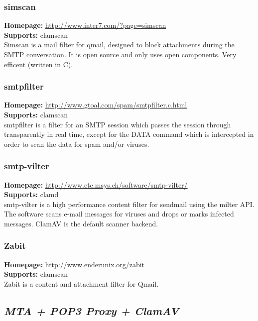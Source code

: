 \documentclass[a4paper,titlepage,12pt]{article}
\begin{document}
    \subsubsection{simscan}
    \textbf{Homepage:} \url{http://www.inter7.com/?page=simscan}\\
    \textbf{Supports:} clamscan\\[4pt]
    Simscan is a mail filter for qmail, designed to block attachments during
    the SMTP conversation. It is open source and only uses open components.
    Very efficent (written in C).

    \subsubsection{smtpfilter}
    \textbf{Homepage:} \url{http://www.gtoal.com/spam/smtpfilter.c.html}\\
    \textbf{Supports:} clamscan\\[4pt]
    smtpfilter is a filter for an SMTP session which passes the session through
    transparently in real time, except for the DATA command which is
    intercepted in order to scan the data for spam and/or viruses.

    \subsubsection{smtp-vilter}
    \textbf{Homepage:} \url{http://www.etc.msys.ch/software/smtp-vilter/}\\
    \textbf{Supports:} clamd\\[4pt]
    smtp-vilter is a high performance content filter for sendmail
    using the milter API.  The software scans e-mail messages for
    viruses and drops or marks infected messages. ClamAV is the default
    scanner backend.

    \subsubsection{Zabit}
    \textbf{Homepage:} \url{http://www.enderunix.org/zabit}\\
    \textbf{Supports:} clamscan\\[4pt]
    Zabit is a content and attachment filter for Qmail.

    \subsection{\emph{MTA + POP3 Proxy + ClamAV}}
\end{document}
